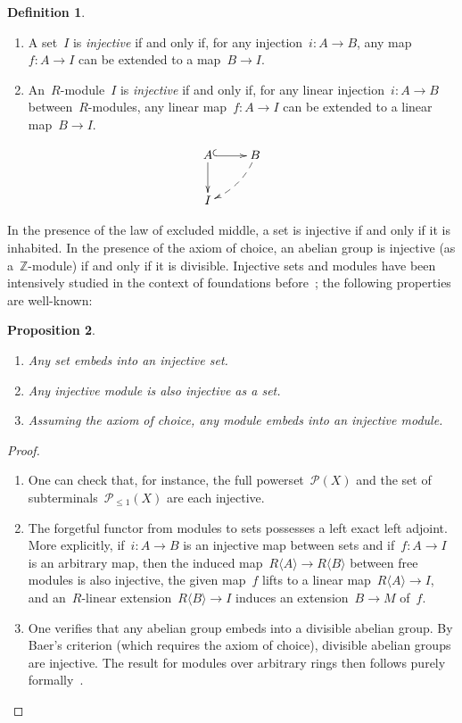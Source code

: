 \documentclass[oneside]{amsart}
\theoremstyle{definition}
\newtheorem{defn}{Definition}[section]
\theoremstyle{plain}
\newtheorem{prop}[defn]{Proposition}
\theoremstyle{remark}
\newcommand{\ZZ}{\mathbb{Z}}
\renewcommand{\P}{\mathcal{P}}
\renewcommand{\_}{\mathpunct{.}\,}
\begin{document}
\begin{defn}\begin{enumerate}
\item A set~$I$ is \emph{injective} if and only if, for any injection~$i
: A \to B$, any map~$f : A \to I$ can be extended to a map~$B \to I$.
\item An~$R$-module~$I$ is \emph{injective} if and only if, for any linear
injection~$i : A \to B$ between~$R$-modules, any linear map~$f : A \to I$ can
be extended to a linear map~$B \to I$.
\end{enumerate}
\[ \xymatrix{
  A \ar@{^{(}->}[r]\ar[d] & B \ar@{-->}@/^/[ld] \\
  I
} \]
\end{defn}

In the presence of the law of excluded middle, a set is injective if and only
if it is inhabited. In the presence of the axiom of choice, an abelian group is
injective (as a~$\ZZ$-module) if and only if it is divisible. Injective sets
and modules have been intensively studied in the context of foundations
before~\cite{blass:inj-proj-axc,harting:locally-injective,kenney:injective-choice,aczel-berg-granstroem-schuster:injective};
the following properties are well-known:

\begin{prop}\label{prop:basics-injective}
\begin{enumerate}
\item Any set embeds into an injective set.
\item Any injective module is also injective as a set.
\item Assuming the axiom of choice, any module embeds into an
injective module.
\end{enumerate}\end{prop}

\begin{proof}\begin{enumerate}
\item One can check that, for instance, the full powerset~$\P(X)$ and the set of
subterminals~$\P_{\leq 1}(X)$ are each injective.~\cite{XXX}
\item The forgetful functor from modules to sets possesses a left exact left
adjoint. More explicitly, if~$i : A \to B$ is an injective map between sets and
if~$f : A \to I$ is an arbitrary map, then the induced map~$R\langle A \rangle
\to R\langle B \rangle$ between free modules is also injective, the given
map~$f$ lifts to a linear map~$R\langle A \rangle \to I$, and an~$R$-linear
extension~$R\langle B \rangle \to I$ induces an extension~$B \to M$ of~$f$.
\item One verifies that any abelian group embeds into a divisible
abelian group. By Baer's criterion (which requires the axiom of choice), divisible abelian groups are injective.
The result for modules over arbitrary rings then follows purely
formally~\cite{XXX}. \qedhere
\end{enumerate}\end{proof}
\end{document}
